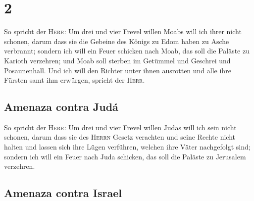 \hypertarget{section-1}{%
\section{2}\label{section-1}}

 So spricht der \textsc{Herr}: Um drei und vier Frevel
willen Moabs will ich ihrer nicht schonen, darum dass sie die Gebeine
des Königs zu Edom haben zu Asche verbrannt;  sondern ich
will ein Feuer schicken nach Moab, das soll die Paläste zu Karioth
verzehren; und Moab soll sterben im Getümmel und Geschrei und
Posaunenhall.  Und ich will den Richter unter ihnen
ausrotten und alle ihre Fürsten samt ihm erwürgen, spricht der
\textsc{Herr}.

\hypertarget{amenaza-contra-juduxe1}{%
\subsection{Amenaza contra Judá}\label{amenaza-contra-juduxe1}}

 So spricht der \textsc{Herr}: Um drei und vier Frevel
willen Judas will ich sein nicht schonen, darum dass sie des
\textsc{Herrn} Gesetz verachten und seine Rechte nicht halten und lassen
sich ihre Lügen verführen, welchen ihre Väter nachgefolgt sind;
 sondern ich will ein Feuer nach Juda schicken, das soll
die Paläste zu Jerusalem verzehren.

\hypertarget{amenaza-contra-israel}{%
\subsection{Amenaza contra Israel}\label{amenaza-contra-israel}}

